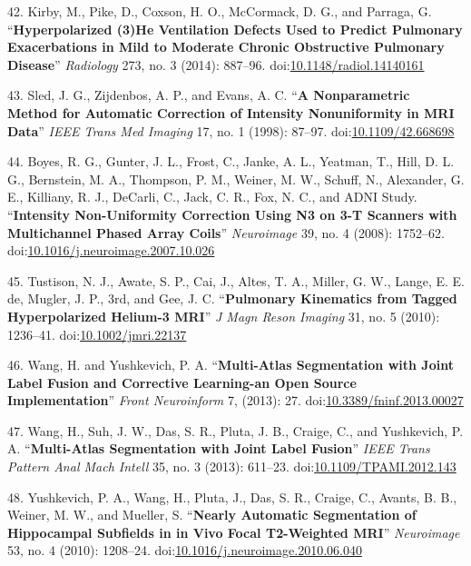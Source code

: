 \documentclass[11pt,]{article}
\begin{document}
\hypertarget{ref-Kirby:2014aa}{}
42. Kirby, M., Pike, D., Coxson, H. O., McCormack, D. G., and Parraga,
G. ``\textbf{Hyperpolarized (3)He Ventilation Defects Used to Predict
Pulmonary Exacerbations in Mild to Moderate Chronic Obstructive
Pulmonary Disease}'' \emph{Radiology} 273, no. 3 (2014): 887--96.
doi:\href{https://doi.org/10.1148/radiol.14140161}{10.1148/radiol.14140161}

\hypertarget{ref-Sled:1998aa}{}
43. Sled, J. G., Zijdenbos, A. P., and Evans, A. C. ``\textbf{A
Nonparametric Method for Automatic Correction of Intensity Nonuniformity
in MRI Data}'' \emph{IEEE Trans Med Imaging} 17, no. 1 (1998): 87--97.
doi:\href{https://doi.org/10.1109/42.668698}{10.1109/42.668698}

\hypertarget{ref-Boyes:2008aa}{}
44. Boyes, R. G., Gunter, J. L., Frost, C., Janke, A. L., Yeatman, T.,
Hill, D. L. G., Bernstein, M. A., Thompson, P. M., Weiner, M. W.,
Schuff, N., Alexander, G. E., Killiany, R. J., DeCarli, C., Jack, C. R.,
Fox, N. C., and ADNI Study. ``\textbf{Intensity Non-Uniformity
Correction Using N3 on 3-T Scanners with Multichannel Phased Array
Coils}'' \emph{Neuroimage} 39, no. 4 (2008): 1752--62.
doi:\href{https://doi.org/10.1016/j.neuroimage.2007.10.026}{10.1016/j.neuroimage.2007.10.026}

\hypertarget{ref-Tustison:2010aa}{}
45. Tustison, N. J., Awate, S. P., Cai, J., Altes, T. A., Miller, G. W.,
Lange, E. E. de, Mugler, J. P., 3rd, and Gee, J. C. ``\textbf{Pulmonary
Kinematics from Tagged Hyperpolarized Helium-3 MRI}'' \emph{J Magn Reson
Imaging} 31, no. 5 (2010): 1236--41.
doi:\href{https://doi.org/10.1002/jmri.22137}{10.1002/jmri.22137}

\hypertarget{ref-Wang:2013aa}{}
46. Wang, H. and Yushkevich, P. A. ``\textbf{Multi-Atlas Segmentation
with Joint Label Fusion and Corrective Learning-an Open Source
Implementation}'' \emph{Front Neuroinform} 7, (2013): 27.
doi:\href{https://doi.org/10.3389/fninf.2013.00027}{10.3389/fninf.2013.00027}

\hypertarget{ref-Wang:2013ab}{}
47. Wang, H., Suh, J. W., Das, S. R., Pluta, J. B., Craige, C., and
Yushkevich, P. A. ``\textbf{Multi-Atlas Segmentation with Joint Label
Fusion}'' \emph{IEEE Trans Pattern Anal Mach Intell} 35, no. 3 (2013):
611--23.
doi:\href{https://doi.org/10.1109/TPAMI.2012.143}{10.1109/TPAMI.2012.143}

\hypertarget{ref-Yushkevich:2010aa}{}
48. Yushkevich, P. A., Wang, H., Pluta, J., Das, S. R., Craige, C.,
Avants, B. B., Weiner, M. W., and Mueller, S. ``\textbf{Nearly Automatic
Segmentation of Hippocampal Subfields in in Vivo Focal T2-Weighted
MRI}'' \emph{Neuroimage} 53, no. 4 (2010): 1208--24.
doi:\href{https://doi.org/10.1016/j.neuroimage.2010.06.040}{10.1016/j.neuroimage.2010.06.040}
\end{document}

